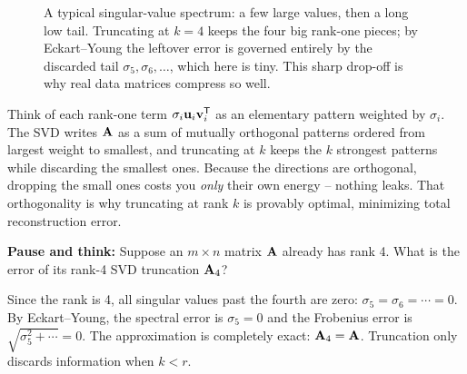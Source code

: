 \begin{figure}[H]
\centering
{}
\caption{A typical singular-value spectrum: a few large values, then a long
low tail. Truncating at $k=4$ keeps the four big rank-one pieces; by
Eckart--Young the leftover error is governed entirely by the discarded tail
$\sigma_5,\sigma_6,\dots$, which here is tiny. This sharp drop-off is why real
data matrices compress so well.}
\label{ch29:fig-sv-spectrum}
\end{figure}

\begin{intuitionbox}
Think of each rank-one term $\sigma_i\mathbf{u}_i\mathbf{v}_i^{\mathsf{T}}$ as an elementary
pattern weighted by $\sigma_i$. The SVD writes $\mathbf{A}$ as a sum of mutually
orthogonal patterns ordered from largest weight to smallest, and truncating at
$k$ keeps the $k$ strongest patterns while discarding the smallest ones. Because the directions are
orthogonal, dropping the small ones costs you \emph{only} their own energy --
nothing leaks. That orthogonality is why truncating at rank $k$ is provably
optimal, minimizing total reconstruction error.
\end{intuitionbox}

\begin{recoverybox}
\textbf{Pause and think:} Suppose an $m \times n$ matrix $\mathbf{A}$ already has rank 4. What is the error of its rank-4 SVD truncation $\mathbf{A}_4$?

Since the rank is 4, all singular values past the fourth are zero: $\sigma_5 = \sigma_6 = \cdots = 0$. By Eckart--Young, the spectral error is $\sigma_5 = 0$ and the Frobenius error is $\sqrt{\sigma_5^2 + \cdots} = 0$. The approximation is completely exact: $\mathbf{A}_4 = \mathbf{A}$. Truncation only discards information when $k < r$.
\end{recoverybox}

